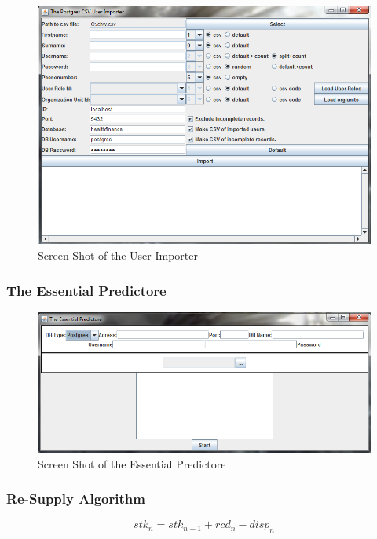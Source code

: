 \begin{figure}
\centering
\includegraphics[width=\textwidth]{case/img/userImporterScreenShot}
\caption{Screen Shot of the User Importer}
\label{fig:screenUser}
\end{figure}
\subsubsection{The Essential Predictore}

\begin{figure}
\centering
\includegraphics[width=\textwidth]{case/img/essentialPredictoreScreenShot}
\caption{Screen Shot of the Essential Predictore}
\label{fig:essPred}
\end{figure}
\subsubsection{Re-Supply Algorithm}

\begin{equation}
stk_{n} = stk_{n-1} + rcd_{n} - disp_{n}
\end{equation}

